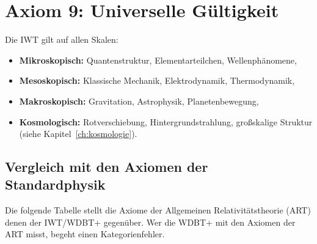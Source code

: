 \section{Axiom 9: Universelle Gültigkeit}
\label{sec:axiom9}

Die IWT gilt auf allen Skalen:

\begin{itemize}
    \item \textbf{Mikroskopisch:} Quantenstruktur, Elementarteilchen, Wellenphänomene,
    \item \textbf{Mesoskopisch:} Klassische Mechanik, Elektrodynamik, Thermodynamik,
    \item \textbf{Makroskopisch:} Gravitation, Astrophysik, Planetenbewegung,
    \item \textbf{Kosmologisch:} Rotverschiebung, Hintergrundstrahlung, großskalige Struktur (siehe Kapitel~\ref{ch:kosmologie}).
\end{itemize}

\subsection{Vergleich mit den Axiomen der Standardphysik}
\label{sec:axiom_vergleich}

Die folgende Tabelle stellt die Axiome der Allgemeinen Relativitätstheorie (ART) 
denen der IWT/WDBT+ gegenüber. Wer die WDBT+ mit den Axiomen der ART misst, 
begeht einen Kategorienfehler.

